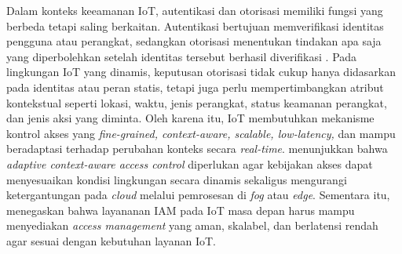Dalam konteks keeamanan IoT, autentikasi dan otorisasi memiliki fungsi yang berbeda tetapi saling berkaitan. Autentikasi bertujuan memverifikasi identitas pengguna atau perangkat, sedangkan otorisasi menentukan tindakan apa saja yang diperbolehkan setelah identitas tersebut berhasil diverifikasi \parencite{diaz_authorization_2025}. Pada lingkungan IoT yang dinamis, keputusan otorisasi tidak cukup hanya didasarkan pada identitas atau peran statis, tetapi juga perlu mempertimbangkan atribut kontekstual seperti lokasi, waktu, jenis perangkat, status keamanan perangkat, dan jenis aksi yang diminta. Oleh karena itu, IoT membutuhkan mekanisme kontrol akses yang \textit{fine-grained, context-aware, scalable, low-latency,} dan mampu beradaptasi terhadap perubahan konteks secara \textit{real-time}. \textcite{kalaria_adaptive_2024} menunjukkan bahwa \textit{adaptive context-aware access control} diperlukan agar kebijakan akses dapat menyesuaikan kondisi lingkungan secara dinamis sekaligus mengurangi ketergantungan pada \textit{cloud} melalui pemrosesan di \textit{fog} atau \textit{edge}. Sementara itu, \textcite{wang_edge-enabled_2025} menegaskan bahwa layananan IAM pada IoT masa depan harus mampu menyediakan \textit{access management} yang aman, skalabel, dan berlatensi rendah agar sesuai dengan kebutuhan layanan IoT.